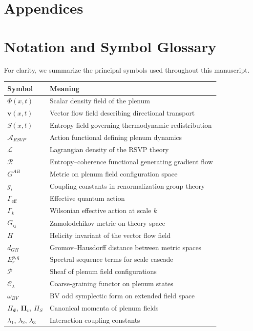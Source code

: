 \documentclass[12pt,a4paper]{article}
\theoremstyle{plain}
\theoremstyle{definition}
\theoremstyle{remark}
\begin{document}
\newpage
\section*{Appendices}

\appendix

\section{Notation and Symbol Glossary}

For clarity, we summarize the principal symbols used throughout this
manuscript.

\medskip
\begin{center}
\begin{tabular}{@{} p{} p{} @{}}
\toprule
Symbol & Meaning \\
\midrule
$\Phi(x,t)$ & Scalar density field of the plenum \\
$\mathbf{v}(x,t)$ & Vector flow field describing directional transport \\
$S(x,t)$ & Entropy field governing thermodynamic redistribution \\
$\mathcal{A}_{RSVP}$ & Action functional defining plenum dynamics \\
$\mathcal{L}$ & Lagrangian density of the RSVP theory \\
$\mathcal{R}$ & Entropy--coherence functional generating gradient flow \\
$G^{AB}$ & Metric on plenum field configuration space \\
$g_i$ & Coupling constants in renormalization group theory \\
$\Gamma_{\text{eff}}$ & Effective quantum action \\
$\Gamma_k$ & Wilsonian effective action at scale $k$ \\
$G_{ij}$ & Zamolodchikov metric on theory space \\
$H$ & Helicity invariant of the vector flow field \\
$d_{GH}$ & Gromov--Hausdorff distance between metric spaces \\
$E_r^{p,q}$ & Spectral sequence terms for scale cascade \\
$\mathcal{P}$ & Sheaf of plenum field configurations \\
$\mathcal{C}_\lambda$ & Coarse-graining functor on plenum states \\
$\omega_{BV}$ & BV odd symplectic form on extended field space \\
$\Pi_\Phi$, $\boldsymbol{\Pi}_v$, $\Pi_S$ & Canonical momenta of plenum fields \\
$\lambda_1$, $\lambda_2$, $\lambda_3$ & Interaction coupling constants \\
\bottomrule
\end{tabular}
\end{center}
\end{document}

